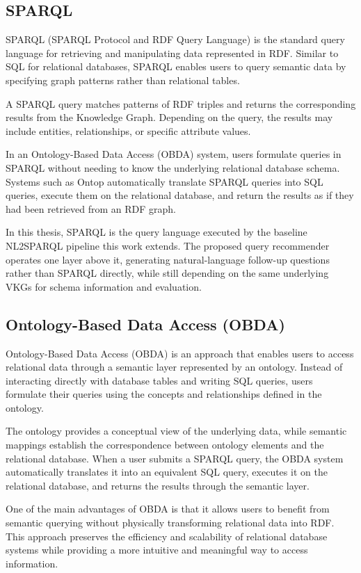 \subsection{SPARQL}
SPARQL (SPARQL Protocol and RDF Query Language) is the standard query language for retrieving and manipulating data represented in RDF. Similar to SQL for relational databases, SPARQL enables users to query semantic data by specifying graph patterns rather than relational tables.

A SPARQL query matches patterns of RDF triples and returns the corresponding results from the Knowledge Graph. Depending on the query, the results may include entities, relationships, or specific attribute values.

In an Ontology-Based Data Access (OBDA) system, users formulate queries in SPARQL without needing to know the underlying relational database schema. Systems such as Ontop automatically translate SPARQL queries into SQL queries, execute them on the relational database, and return the results as if they had been retrieved from an RDF graph.

In this thesis, SPARQL is the query language executed by the baseline NL2SPARQL pipeline this work extends. The proposed query recommender operates one layer above it, generating natural-language follow-up questions rather than SPARQL directly, while still depending on the same underlying VKGs for schema information and evaluation.

\subsection{Ontology-Based Data Access (OBDA)}
Ontology-Based Data Access (OBDA) is an approach that enables users to access relational data through a semantic layer represented by an ontology. Instead of interacting directly with database tables and writing SQL queries, users formulate their queries using the concepts and relationships defined in the ontology.

The ontology provides a conceptual view of the underlying data, while semantic mappings establish the correspondence between ontology elements and the relational database. When a user submits a SPARQL query, the OBDA system automatically translates it into an equivalent SQL query, executes it on the relational database, and returns the results through the semantic layer.

One of the main advantages of OBDA is that it allows users to benefit from semantic querying without physically transforming relational data into RDF. This approach preserves the efficiency and scalability of relational database systems while providing a more intuitive and meaningful way to access information.


